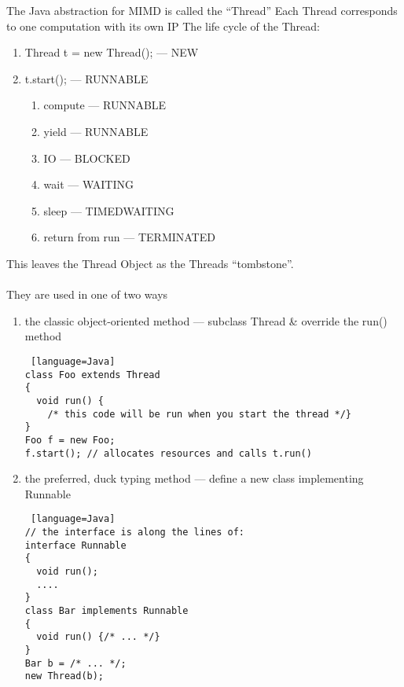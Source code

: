 \documentclass[../../lecture_notes.tex]{subfiles}
\begin{document}
The Java abstraction for MIMD is called the “Thread”
Each Thread corresponds to one computation with its own IP
The life cycle of the Thread:
\begin{enumerate} [itemsep=0mm]
	\item Thread t = new Thread(); — NEW
	\item t.start(); — RUNNABLE
	\begin{enumerate} [itemsep=0mm]
		\item compute — RUNNABLE
		\item yield — RUNNABLE
		\item IO — BLOCKED
		\item wait — WAITING
		\item sleep — TIMEDWAITING
		\item return from run — TERMINATED
	\end{enumerate}
\end{enumerate}
This leaves the Thread Object as the Threads “tombstone”.\\
\\
They are used in one of two ways
\begin{enumerate} [itemsep=0mm]
	\item the classic object-oriented method — subclass Thread \& override the run() method
		\begin{lstlisting} [language=Java]
class Foo extends Thread
{
  void run() {
    /* this code will be run when you start the thread */}
}
Foo f = new Foo;
f.start(); // allocates resources and calls t.run()
		\end{lstlisting}
	\item the preferred, duck typing method — define a new class implementing Runnable
		\begin{lstlisting} [language=Java]
// the interface is along the lines of:
interface Runnable 
{
  void run();
  ....
}
class Bar implements Runnable
{
  void run() {/* ... */}
}
Bar b = /* ... */;
new Thread(b);
	 \end{lstlisting}
\end{enumerate} \medskip
\end{document}
